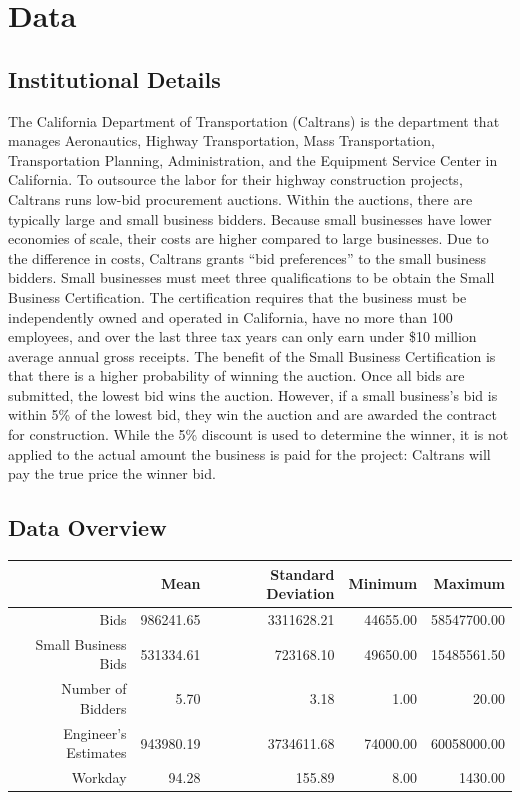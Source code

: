 \section{Data}

\subsection{Institutional Details}

The California Department of Transportation (Caltrans) is the department that
manages Aeronautics, Highway Transportation, Mass Transportation,
Transportation Planning, Administration, and the Equipment Service Center in
California. To outsource the labor for their highway construction projects,
Caltrans runs low-bid procurement auctions. Within the auctions, there are
typically large and small business bidders. Because small businesses have lower
economies of scale, their costs are higher compared to large businesses. Due to
the difference in costs, Caltrans grants ``bid preferences'' to the small
business bidders. Small businesses must meet three qualifications to be obtain
the Small Business Certification. The certification requires that the business
must be independently owned and operated in California, have no more than 100
employees, and over the last three tax years can only earn under \$10 million
average annual gross receipts. The benefit of the Small Business Certification
is that there is a higher probability of winning the auction. Once all bids are
submitted, the lowest bid wins the auction. However, if a small business’s bid
is within 5\% of the lowest bid, they win the auction and are awarded the
contract for construction. While the 5\% discount is used to determine the
winner, it is not applied to the actual amount the business is paid for the
project: Caltrans will pay the true price the winner bid.

\subsection{Data Overview}

\begin{table}[ht]
\begin{tabular}{rrrrr}
  \toprule
 & Mean & Standard Deviation & Minimum & Maximum \\ 
  \midrule
Bids & 986241.65 & 3311628.21 & 44655.00 & 58547700.00 \\ 
  Small Business Bids & 531334.61 & 723168.10 & 49650.00 & 15485561.50 \\ 
  Number of Bidders & 5.70 & 3.18 & 1.00 & 20.00 \\ 
  Engineer's Estimates & 943980.19 & 3734611.68 & 74000.00 & 60058000.00 \\ 
  Workday & 94.28 & 155.89 & 8.00 & 1430.00 \\ 
   \bottomrule
\end{tabular}
\end{table}

